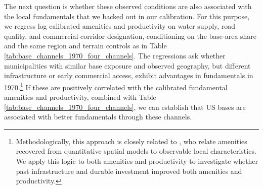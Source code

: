 \documentclass[12pt, unicode, a4paper]{article}
\newcommand{\1}{\mbox{1}\hspace{-0.25em}\mbox{l}} %
\begin{document}
The next question is whether these observed conditions are also associated with the local fundamentals that we backed out in our calibration. 
For this purpose, we regress log calibrated amenities and productivity on water supply, road quality, and commercial-corridor designation, conditioning on the base-area share and the same region and terrain controls as in Table \ref{tab:base_channels_1970_four_channels}. The regressions ask whether municipalities with similar base exposure and observed geography, but different infrastructure or early commercial access, exhibit advantages in fundamentals in 1970.\footnote{
Methodologically, this approach is closely related to \citet{ang2026amenities}, who relate amenities recovered from quantitative spatial models to observable local characteristics. We apply this logic to both amenities and productivity to investigate whether past infrastructure and durable investment improved both amenities and productivity.
} If these are positively correlated with the calibrated fundamental amenities and productivity, combined with Table \ref{tab:base_channels_1970_four_channels}, we can establish that US bases are associated with better fundamentals through these channels.
\end{document}
